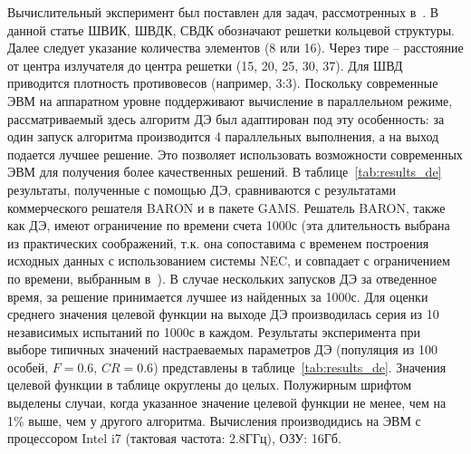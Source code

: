 \documentclass{llncs}
\begin{document}
Вычислительный эксперимент был поставлен для задач, рассмотренных в~\cite{tyunin:daor,tyunin:oniip}. В данной статье ШВИК, ШВДК, СВДК обозначают решетки кольцевой структуры. Далее следует указание количества элементов (8 или 16). Через тире -- расстояние от центра излучателя до центра решетки (15, 20, 25, 30, 37). Для ШВД приводится плотность противовесов (например, 3:3). Поскольку современные ЭВМ на аппаратном уровне поддерживают вычисление в параллельном режиме, рассматриваемый здесь алгоритм ДЭ был адаптирован под эту особенность: за один запуск алгоритма производится 4 параллельных выполнения, а на выход подается лучшее решение. Это позволяет использовать возможности современных ЭВМ для получения более качественных решений. В таблице~\ref{tab:results_de} результаты, полученные с помощью ДЭ, сравниваются с результатами коммерческого решателя BARON и в пакете GAMS.
Решатель BARON, также как ДЭ, имеют ограничение по времени счета 1000с (эта длительность выбрана из практических соображений, т.к. она сопоставима с временем построения исходных данных с использованием системы NEC, и совпадает с ограничением по времени, выбранным в~\cite{tyunin:daor}).
В случае нескольких запусков ДЭ за отведенное время, за решение принимается лучшее из найденных за 1000с. Для оценки среднего значения целевой функции на выходе ДЭ производилась серия из 10 независимых испытаний по 1000с в каждом. Результаты эксперимента при выборе типичных значений настраеваемых параметров ДЭ (популяция из 100 особей, $F=0.6$, $CR=0.6$) представлены в  таблице~\ref{tab:results_de}. Значения целевой функции в таблице округлены до целых. Полужирным шрифтом выделены случаи, когда указанное значение целевой функции не менее, чем на 1\% выше, чем у другого алгоритма. Вычисления производидись на ЭВМ с процессором Intel i7 (тактовая частота:
2.8ГГц), ОЗУ: 16Гб.
\end{document}
